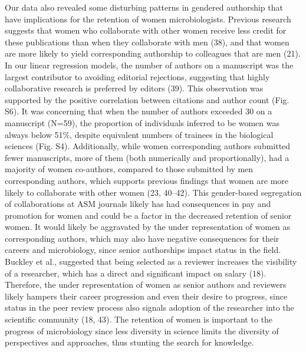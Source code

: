 \documentclass[11pt,]{article}
\begin{document}
Our data also revealed some disturbing patterns in gendered authorship
that have implications for the retention of women microbiologists.
Previous research suggests that women who collaborate with other women
receive less credit for these publications than when they collaborate
with men (38), and that women are more likely to yield corresponding
authorship to colleagues that are men (21). In our linear regression
models, the number of authors on a manuscript was the largest
contributor to avoiding editorial rejections, suggesting that highly
collaborative research is preferred by editors (39). This observation
was supported by the positive correlation between citations and author
count (Fig. S6). It was concerning that when the number of authors
exceeded 30 on a manuscript (N=59), the proportion of individuals
inferred to be women was always below 51\%, despite equivalent numbers
of trainees in the biological sciences (Fig. S4). Additionally, while
women corresponding authors submitted fewer manuscripts, more of them
(both numerically and proportionally), had a majority of women
co-authors, compared to those submitted by men corresponding authors,
which supports previous findings that women are more likely to
collaborate with other women (23, 40--42). This gender-based segregation
of collaborations at ASM journals likely has had consequences in pay and
promotion for women and could be a factor in the decreased retention of
senior women. It would likely be aggravated by the under representation
of women as corresponding authors, which may also have negative
consequences for their careers and microbiology, since senior
authorships impact status in the field. Buckley et al., suggested that
being selected as a reviewer increases the visibility of a researcher,
which has a direct and significant impact on salary (18). Therefore, the
under representation of women as senior authors and reviewers likely
hampers their career progression and even their desire to progress,
since status in the peer review process also signals adoption of the
researcher into the scientific community (18, 43). The retention of
women is important to the progress of microbiology since less diversity
in science limits the diversity of perspectives and approaches, thus
stunting the search for knowledge.
\end{document}
